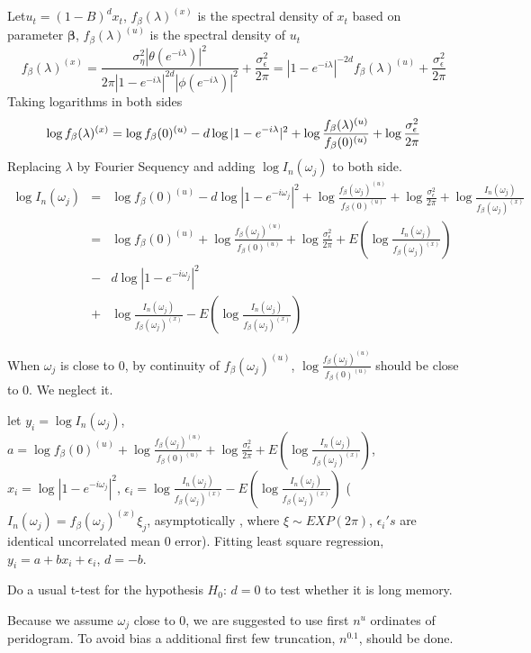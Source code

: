 \documentclass[10pt,a4paper]{article}
\begin{document}
Let$u_t=(1-B)^dx_t$, $f_\beta(\lambda)^{(x)}$ is the spectral density of $x_t$ based on parameter $\bm{\beta} $, $f_\beta(\lambda)^{(u)}$ is the spectral density of $u_t$
$$f_\beta(\lambda)^{(x)}=\frac{\sigma_\eta^2|\theta(e^{-i\lambda})|^2}{2\pi|1-e^{-i\lambda}|^{2d}|\phi(e^{-i\lambda})|^2}+\frac{\sigma^2_\epsilon}{2\pi}=|1-e^{-i\lambda}|^{-2d}f_\beta(\lambda)^{(u)}+\frac{\sigma^2_\epsilon}{2\pi}$$
Taking logarithms in both sides 
\[
\log f_\beta(\lambda)^{(x)}=\log f_\beta(0)^{(u)}-d\log |1-e^{-i\lambda}|^{2}+\log\frac{f_\beta(\lambda)^{(u)}}{f_\beta(0)^{(u)}}+\log\frac{\sigma^2_\epsilon}{2\pi}\\
\] Replacing $\lambda$ by Fourier Sequency and adding $\log I_n(\omega_j)$ to both side.
\begin{eqnarray*}\log I_n(\omega_j)&=&\log f_\beta(0)^{(u)}-d\log |1-e^{-i\omega_j}|^{2}+\log\frac{f_\beta(\omega_j)^{(u)}}{f_\beta(0)^{(u)}}+\log\frac{\sigma^2_\epsilon}{2\pi}+\log\frac{ I_n(\omega_j)}{f_\beta(\omega_j)^{(x)}}\\
&=&\log f_\beta(0)^{(u)}+\log\frac{f_\beta(\omega_j)^{(u)}}{f_\beta(0)^{(u)}}+\log\frac{\sigma^2_\epsilon}{2\pi}+E(\log\frac{ I_n(\omega_j)}{f_\beta(\omega_j)^{(x)}})\\
&-&d\log |1-e^{-i\omega_j}|^{2}\\
&+&\log\frac{ I_n(\omega_j)}{f_\beta(\omega_j)^{(x)}}-E(\log\frac{ I_n(\omega_j)}{f_\beta(\omega_j)^{(x)}})
\end{eqnarray*}

When $\omega_j$ is close to 0, by continuity of $f_\beta(\omega_j)^{(u)}$, $\log\frac{f_\beta(\omega_j)^{(u)}}{f_\beta(0)^{(u)}}$ should be close to 0. We neglect it. 

let $y_i=\log I_n(\omega_j)$, $a=\log f_\beta(0)^{(u)}+\log\frac{f_\beta(\omega_j)^{(u)}}{f_\beta(0)^{(u)}}+\log\frac{\sigma^2_\epsilon}{2\pi}+E(\log\frac{ I_n(\omega_j)}{f_\beta(\omega_j)^{(x)}})$, $x_i=\log |1-e^{-i\omega_j}|^{2}$, $\epsilon_i=\log\frac{ I_n(\omega_j)}{f_\beta(\omega_j)^{(x)}}-E(\log\frac{ I_n(\omega_j)}{f_\beta(\omega_j)^{(x)}})$ ($I_n(\omega_j)=  f_\beta(\omega_j)^{(x)}\xi_j$, asymptotically , where $\xi\sim EXP(2\pi)$, $\epsilon_i's$ are identical uncorrelated mean 0 error). Fitting least square regression, $y_i=a+bx_i+\epsilon_i$, $d=-b$.

Do a usual t-test for the hypothesis $H_0: \, d=0$ to test whether it is long memory.

Because we assume $\omega_j$ close to 0, we are suggested to use first $n^u$ ordinates of peridogram. To avoid bias a additional first few truncation, $n^{0.1}$, should be done.
\end{document}
